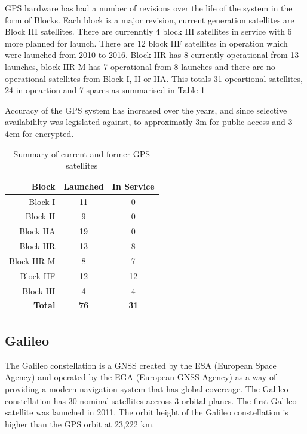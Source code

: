 GPS hardware has had a number of revisions over the life of the system in the form of Blocks. Each block is a major revision, current generation satellites are Block III
satellites. There are currenntly 4 block III satellites in service with 6 more planned for launch. There are 12 block IIF satellites in operation which were launched from
2010 to 2016. Block IIR has 8 currently operational from 13 launches, block IIR-M has 7 operational from 8 launches and there are no operational satellites from Block I,
II or IIA. This totals 31 opeartional satellites, 24 in opeartion and 7 spares as summarised in Table \ref{tab:GPSSatSum}

Accuracy of the GPS system has increased over the years, and since selective availabililty was legislated against, to approximatly 3m for public access and 3-4cm for
encrypted.

\renewcommand{\arraystretch}{1.5}
\begin{table}
    \begin{center}
        \caption{Summary of current and former GPS satellites}
        \label{tab:GPSSatSum}
        \begin{tabular}{ |r|c|c| }
            \hline
            \textbf{Block} & \textbf{Launched} & \textbf{In Service} \\
            \hline
            Block I & 11 & 0\\
            \hline
            Block II & 9 & 0\\
            \hline
            Block IIA & 19 & 0\\
            \hline
            Block IIR & 13 & 8\\
            \hline
            Block IIR-M & 8 & 7\\
            \hline
            Block IIF & 12 & 12\\
            \hline
            Block III & 4 & 4\\
            \hline
            \hline
            \textbf{Total} & \textbf{76} & \textbf{31}\\
            \hline
        \end{tabular}
    \end{center}
\end{table}
\renewcommand{\arraystretch}{1}

\subsection{Galileo} \label{subsec:GNSS_GalileoIntro}
The Galileo constellation is a GNSS created by the ESA (European Space Agency) and operated by the EGA (European GNSS Agency) as a way of providing a modern navigation
system that has global covereage. The Galileo constellation has 30 nominal satellites accross 3 orbital planes. The first Galileo satellite was launched in 2011.
The orbit height of the Galileo constellation is higher than the GPS orbit at 23,222 km. 

